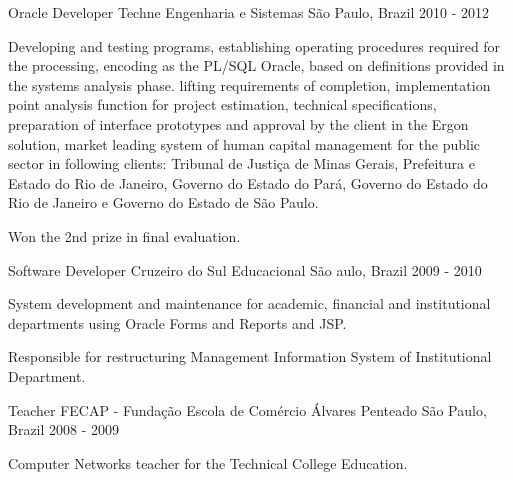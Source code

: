 \begin{cventries}
  \cventry
    {Oracle Developer} %
    {Techne Engenharia e Sistemas} %
	{São Paulo, Brazil} %
    {2010 - 2012} %
    {
      \begin{cvitems} %
        \item {Developing and testing programs, establishing operating procedures required for the processing, encoding as the PL/SQL Oracle, based on definitions provided in the systems analysis phase.
lifting requirements of completion, implementation point analysis function for project estimation, technical specifications, preparation of interface prototypes and approval by the client in the Ergon solution, market leading system of human capital management for the public sector in following clients: Tribunal de Justiça de Minas Gerais, Prefeitura e Estado do Rio de Janeiro, Governo do Estado do Pará, Governo do Estado do Rio de Janeiro e Governo do Estado de São Paulo.}
        \item {Won the 2nd prize in final evaluation.}
      \end{cvitems}
    }

  \cventry
    {Software Developer} %
    {Cruzeiro do Sul Educacional} %
    {São aulo, Brazil} %
    {2009 - 2010} %
    {
      \begin{cvitems} %
        \item {System development and maintenance for academic, financial and institutional departments using Oracle Forms and Reports and JSP.}
        \item {Responsible for restructuring Management Information System of Institutional Department.}
      \end{cvitems}
    }

  \cventry
    {Teacher} %
    {FECAP - Fundação Escola de Comércio Álvares Penteado} %
    {São Paulo, Brazil} %
    {2008 - 2009} %
    {
      \begin{cvitems} %
        \item {Computer Networks teacher for the Technical College Education.}
      \end{cvitems}
    }


\end{cventries}
